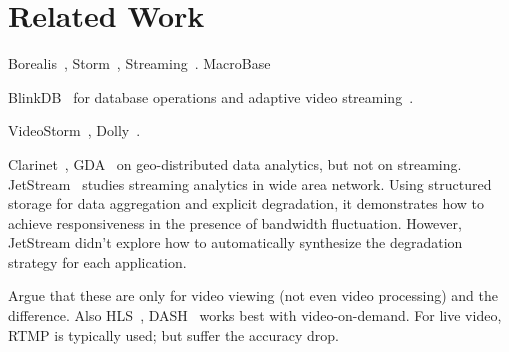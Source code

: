 \section{Related Work}
\label{sec:related-work}

 Borealis~\cite{abadi2005design},
Storm~\cite{toshniwal2014storm}, Streaming~\cite{zaharia2013discretized}.
MacroBase

 BlinkDB~\cite{agarwal2013blinkdb} for database
operations and adaptive video streaming~\cite{yin2015control}.

 VideoStorm~\cite{zhang2017live},
Dolly~\cite{ananthanarayanan2013effective}.

 Clarinet~\cite{viswanathan2016clarinet}, GDA~\cite{pu2015low}
on geo-distributed data analytics, but not on
streaming. JetStream~\cite{rabkin2014aggregation} studies streaming analytics in
wide area network. Using structured storage for data aggregation and explicit
degradation, it demonstrates how to achieve responsiveness in the presence of
bandwidth fluctuation. However, JetStream didn't explore how to automatically
synthesize the degradation strategy for each application.

 Argue that these are only for video viewing (not even
video processing) and the difference. Also HLS~\cite{pantos2016http},
DASH~\cite{michalos2012dynamic} works best with video-on-demand. For live video,
RTMP is typically used; but suffer the accuracy drop.



